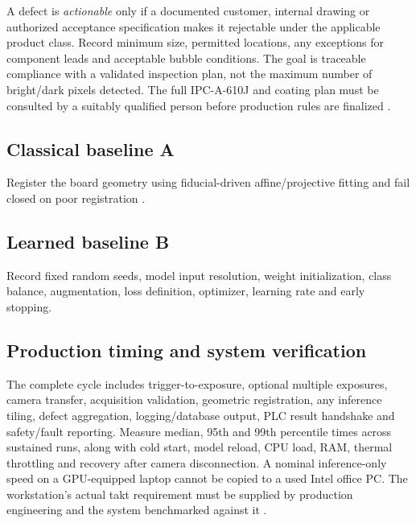 A defect is \emph{actionable} only if a documented customer, internal drawing or authorized acceptance specification makes it rejectable under the applicable product class. Record minimum size, permitted locations, any exceptions for component leads and acceptable bubble conditions. The goal is traceable compliance with a validated inspection plan, not the maximum number of bright/dark pixels detected. The full IPC-A-610J and coating plan must be consulted by a suitably qualified person before production rules are finalized \citep{ipca610j,ipc2024release}.

\subsection{Classical baseline A}
Register the board geometry using fiducial-driven affine/projective fitting and fail closed on poor registration \citep{fischler1981ransac}.

\subsection{Learned baseline B}
Record fixed random seeds, model input resolution, weight initialization, class balance, augmentation, loss definition, optimizer, learning rate and early stopping.

\subsection{Production timing and system verification}
The complete cycle includes trigger-to-exposure, optional multiple exposures, camera transfer, acquisition validation, geometric registration, any inference tiling, defect aggregation, logging/database output, PLC result handshake and safety/fault reporting. Measure median, 95th and 99th percentile times across sustained runs, along with cold start, model reload, CPU load, RAM, thermal throttling and recovery after camera disconnection. A nominal inference-only speed on a GPU-equipped laptop cannot be copied to a used Intel office PC. The workstation's actual takt requirement must be supplied by production engineering and the system benchmarked against it \citep{onnxproviders,openvino2026}.
